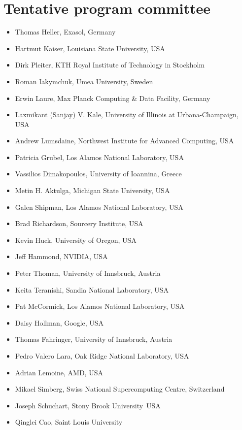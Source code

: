 \documentclass{article}
\begin{document}
\section*{Tentative program committee} 

\begin{itemize}
    \item Thomas Heller, Exasol, Germany
    \item Hartmut Kaiser, Louisiana State University, USA 
    \item Dirk Pleiter, KTH Royal Institute of Technology in Stockholm
    \item Roman Iakymchuk, Umea University, Sweden
    \item Erwin Laure, Max Planck Computing \& Data Facility, Germany
    \item Laxmikant (Sanjay) V. Kale, University of Illinois at Urbana-Champaign, USA
    \item Andrew Lumsdaine, Northwest Institute for Advanced Computing, USA
    \item Patricia Grubel, Los Alamos National Laboratory, USA
    \item Vassilios Dimakopoulos, University of Ioannina, Greece
    \item Metin H. Aktulga, Michigan State University, USA
    \item Galen Shipman, Los Alamos National Laboratory, USA
    \item Brad Richardson, Sourcery Institute, USA
    \item Kevin Huck, University of Oregon, USA
    \item Jeff Hammond, NVIDIA, USA
    \item Peter Thoman, University of Innsbruck, Austria
    \item Keita Teranishi, Sandia National Laboratory, USA 
    \item Pat McCormick, Los Alamos National Laboratory, USA
    \item Daisy Hollman, Google, USA
    \item Thomas Fahringer, University of Innsbruck, Austria
    \item Pedro Valero Lara, Oak Ridge National Laboratory, USA 
    \item Adrian Lemoine, AMD, USA
    \item Mikael Simberg, Swiss National Supercomputing Centre, Switzerland
    \item Joseph Schuchart, Stony Brook University\, USA
    \item Qinglei Cao, Saint Louis University
\end{itemize}
\end{document}
